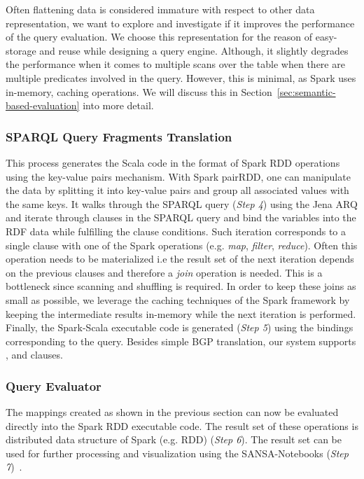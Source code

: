 Often flattening data is considered immature with respect to other data representation, we want to explore and investigate if it improves the performance of the query evaluation.
We choose this representation for the reason of easy-storage and reuse while designing a query engine. 
Although, it slightly degrades the performance when it comes to multiple scans over the table when there are multiple predicates involved in the query. However, this is minimal, as Spark uses in-memory, caching operations.
We will discuss this in Section~\ref{sec:semantic-based-evaluation} into more detail.

\subsubsection{SPARQL Query Fragments Translation}
This process generates the Scala code in the format of Spark \gls{RDD} operations using the key-value pairs mechanism.
With Spark pairRDD, one can manipulate the data by splitting it into key-value pairs and group all associated values with the same keys. 
It walks through the \gls{SPARQL} query (\textit{Step 4}) using the Jena ARQ and iterate through clauses in the \gls{SPARQL} query and bind the variables into the \gls{RDF} data while fulfilling the clause conditions.
Such iteration corresponds to a single clause with one of the Spark operations (e.g. \emph{map}, \emph{filter}, \emph{reduce}).
Often this operation needs to be materialized i.e the result set of the next iteration depends on the previous clauses and therefore a \emph{join} operation is needed.
This is a bottleneck since scanning and shuffling is required.
In order to keep these joins as small as possible, we leverage the caching techniques of the Spark framework by keeping the intermediate results in-memory while the next iteration is performed.
Finally, the Spark-Scala executable code is generated (\textit{Step 5}) using the bindings corresponding to the query.
Besides simple \gls{BGP} translation, our system supports ,  and  clauses.

\subsubsection{Query Evaluator}
The mappings created as shown in the previous section can now be evaluated directly into the Spark \gls{RDD} executable code.
The result set of these operations is distributed data structure of Spark (e.g. \gls{RDD}) (\textit{Step 6}).
The result set can be used for further processing and visualization using the SANSA-Notebooks (\textit{Step 7})~\cite{iermilov-2017-sansa-iswc-demo}.

